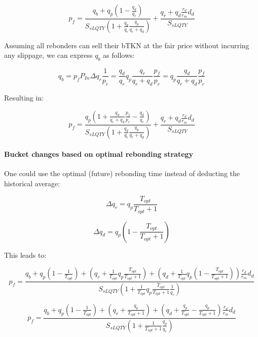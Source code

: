 \documentclass{article}
\begin{document}
\begin{equation}
p_{f} = \frac{q_{b}+q_{p} \left(1-\frac{q_{d}}{q_{r}}\right)}{S_{sLQTY} \left( 1+\frac{q_{d}}{q_{r}}\frac{q_{p}}{q_{r}+q_{d}} \right)} + \frac{q_{r}+q_{d}\frac{r_{d}}{r_{m}}d_{d}}{S_{sLQTY}}
\end{equation}

Assuming all rebonders can sell their bTKN at the fair price without incurring any slippage, we can express $q_b$ as follows:

\begin{equation}
q_{b} = p_f P_{In} \Delta q_{r} \frac{1}{p_r} = \frac{q_{d}}{q_{r}} q_p \frac{q_{r}}{q_{r}+q_{d}} \frac{p_{f}}{p_{r}}  = q_p \frac{q_{d}}{q_{r}+q_{d}} \frac{p_{f}}{p_{r}}
\end{equation}

Resulting in:

\begin{equation}
p_{f} = \frac{q_{p} \left(1+\frac{q_{d}}{q_{r}+q_{d}} \frac{p_{f}}{p_{r}}-\frac{q_{d}}{q_{r}}\right)}{S_{sLQTY} \left( 1+\frac{q_{d}}{q_{r}}\frac{q_{p}}{q_{r}+q_{d}} \right)} + \frac{q_{r}+q_{d}\frac{r_{d}}{r_{m}}d_{d}}{S_{sLQTY}}
\end{equation}

\paragraph{Bucket changes based on optimal rebonding strategy}
One could use the optimal (future) rebonding time instead of deducting the historical average:

\begin{equation}
\Delta q_{r} = q_{p} \frac{T_{opt}}{T_{opt}+1}
\end{equation}

\begin{equation}
\Delta q_{d} = q_{p} \left( 1- \frac{T_{opt}}{T_{opt}+1} \right)
\end{equation}

This leads to:

\[
p_{f} = \frac{q_{b}+q_{p} \left(1-\frac{1}{T_{opt}}\right)+\left(q_{r}+\frac{1}{T_{opt}} q_{p} \frac{T_{opt}}{T_{opt}+1}\right)+ \left(q_{d}+\frac{1}{T_{opt}} q_{p} \left( 1- \frac{T_{opt}}{T_{opt}+1}\right)\right)\frac{r_{d}}{r_{m}}d_{d}}{S_{sLQTY} \left( 1+\frac{1}{T_{opt}} q_{p} \frac{T_{opt}}{T_{opt}+1}\frac{1}{q_{r}} \right)}
\]

\[
p_{f} = \frac{q_{b}+q_{p} \left(1-\frac{1}{T_{opt}}\right)+\left(q_{r}+ \frac{q_{p}}{T_{opt}+1}\right)+ \left(q_{d}+\frac{q_{p}}{T_{opt}} - \frac{q_{p}}{T_{opt}+1}\right)\frac{r_{d}}{r_{m}}d_{d}}{S_{sLQTY} \left( 1+ \frac{1}{T_{opt}+1}\frac{q_{p}}{q_{r}} \right)}
\]
\end{document}
